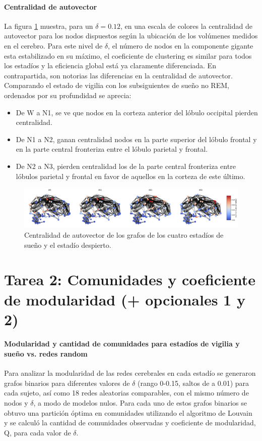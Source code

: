 \documentclass{article}
\begin{document}
\paragraph*{Centralidad de autovector}
La figura \ref{fg:centralidadAutovector} muestra, para un $\delta = 0.12$, en una escala de colores la centralidad de autovector para los nodos dispuestos según la ubicación de los volúmenes medidos en el cerebro.
Para este nivel de $\delta$, el número de nodos en la componente gigante esta estabilizado en su máximo, el coeficiente de clustering es similar para todos los estadíos y la eficiencia global está ya claramente diferenciada.
En contrapartida, son notorias las diferencias en la centralidad de autovector.
Comparando el estado de vigilia con los subsiguientes de sueño no REM, ordenados por su profundidad se aprecia: 
\begin{itemize}
	\item De W a N1, se ve que nodos en la corteza anterior del lóbulo occipital pierden centralidad.
	\item De N1 a N2, ganan centralidad nodos en la parte superior del lóbulo frontal y en la parte central fronteriza entre el lóbulo parietal y frontal.
	\item De N2 a N3, pierden centralidad los de la parte central fronteriza entre lóbulos parietal y frontal en favor de aquellos en la corteza de este último. 
\end{itemize}

\begin{figure}[!htb]
	\centering
	\includegraphics[width= \linewidth]{centralidadDensidadCeroPuntoDoce.png}
	\caption{Centralidad de autovector de los grafos de los cuatro estadíos de sueño y el estadío despierto.}
	\label{fg:centralidadAutovector}
\end{figure}



\section{Tarea 2: Comunidades y coeficiente de modularidad (+ opcionales 1 y 2)}


\paragraph{Modularidad y cantidad de comunidades para estadíos de vigilia y sueño vs. redes random}
Para analizar la modularidad de las redes cerebrales en cada estadío se generaron grafos binarios para diferentes valores de $\delta$ (rango 0-0.15, saltos de a 0.01) para cada sujeto, así como 18 redes aleatorias comparables, con el mismo número de nodos y $\delta$, a modo de modelos nulos.
Para cada uno de estos grafos binarios se obtuvo una partición óptima en comunidades utilizando el algoritmo de Louvain \cite{blondel_fast_2008} y se calculó la cantidad de comunidades observadas y coeficiente de modularidad, Q, para cada valor de $\delta$.
\end{document}

